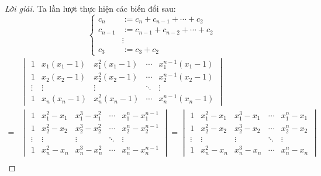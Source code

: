 \documentclass[class=nhvh-linear-algebra,crop=false]{standalone}
\begin{document}
\begin{proof}[Lời giải]
	\par Ta lần lượt thực hiện các biến đổi sau:
	\[
		\begin{cases}
			c_{n}   & := c_{n} + c_{n-1} + \cdots + c_{2}   \\
			c_{n-1} & := c_{n-1} + c_{n-2} + \cdots + c_{2} \\
			        & \vdots                                \\
			c_{3}   & := c_{3} + c_{2}
		\end{cases}
	\]
	\begingroup{}
	\allowdisplaybreaks{}
	\begin{align*}
		  & \begin{vmatrix}
			    1      & x_{1}(x_{1} - 1) & x_{1}^{2}(x_{1} - 1) & \cdots & x_{1}^{n-1}(x_{1} - 1) \\
			    1      & x_{2}(x_{2} - 1) & x_{2}^{2}(x_{2} - 1) & \cdots & x_{2}^{n-1}(x_{2} - 1) \\
			    \vdots & \vdots           & \vdots               & \ddots & \vdots                 \\
			    1      & x_{n}(x_{n} - 1) & x_{n}^{2}(x_{n} - 1) & \cdots & x_{n}^{n-1}(x_{n} - 1)
		    \end{vmatrix}                                                                                                                                               \\
		= &
		\begin{vmatrix}
			1      & x_{1}^{2} - x_{1} & x_{1}^{3} - x_{1}^{2} & \cdots & x_{1}^{n} - x_{1}^{n-1} \\
			1      & x_{2}^{2} - x_{2} & x_{2}^{3} - x_{2}^{2} & \cdots & x_{2}^{n} - x_{2}^{n-1} \\
			\vdots & \vdots            & \vdots                & \ddots & \vdots                  \\
			1      & x_{n}^{2} - x_{n} & x_{n}^{3} - x_{n}^{2} & \cdots & x_{n}^{n} - x_{n}^{n-1}
		\end{vmatrix}
		=
		\begin{vmatrix}
			1      & x_{1}^{2} - x_{1} & x_{1}^{3} - x_{1} & \cdots & x_{1}^{n} - x_{1} \\
			1      & x_{2}^{2} - x_{2} & x_{2}^{3} - x_{2} & \cdots & x_{2}^{n} - x_{2} \\
			\vdots & \vdots            & \vdots            & \ddots & \vdots            \\
			1      & x_{n}^{2} - x_{n} & x_{n}^{3} - x_{n} & \cdots & x_{n}^{n} - x_{n}
		\end{vmatrix}                                                                                                                                                          \\

\end{align*}
\end{proof}
\end{document}
